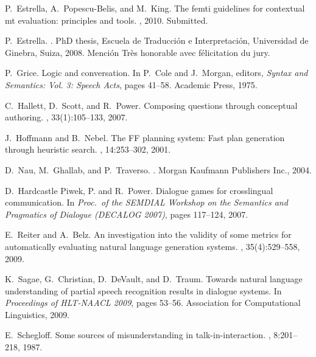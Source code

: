 \documentclass[11pt]{article}
\begin{document}
\begin{thebibliography}{}
P.~Estrella, A.~Popescu-Belis, and M.~King.
\newblock The femti guidelines for contextual mt evaluation: principles and
  tools.
, 2010.
\newblock Submitted.

P.~Estrella.
.
\newblock PhD thesis, Escuela de Traducción e Interpretación, Universidad de
  Ginebra, Suiza, 2008.
\newblock Menci\'on Tr\`es honorable avec f\'elicitation du jury.

P.~Grice.
\newblock Logic and conversation.
\newblock In P.~Cole and J.~Morgan, editors, {\em Syntax and Semantics: Vol. 3:
  Speech Acts}, pages 41--58. Academic Press, 1975.

C.~Hallett, D.~Scott, and R.~Power.
\newblock Composing questions through conceptual authoring.
, 33(1):105--133, 2007.

J.~Hoffmann and B.~Nebel.
\newblock The {FF} planning system: Fast plan generation through heuristic
  search.
, 14:253--302, 2001.

D.~Nau, M.~Ghallab, and P.~Traverso.
.
\newblock Morgan Kaufmann Publishers Inc., 2004.

D.~Hardcastle Piwek, P. and R.~Power.
\newblock Dialogue games for crosslingual communication.
\newblock In {\em Proc.\ of the {SEMDIAL} Workshop on the Semantics and
  Pragmatics of Dialogue ({DECALOG} 2007)}, pages 117--124, 2007.

E.~Reiter and A.~Belz.
\newblock An investigation into the validity of some metrics for automatically
  evaluating natural language generation systems.
, 35(4):529--558, 2009.

K.~Sagae, G.~Christian, D.~DeVault, and D.~Traum.
\newblock Towards natural language understanding of partial speech recognition
  results in dialogue systems.
\newblock In {\em Proceedings of HLT-NAACL 2009}, pages 53--56. Association for
  Computational Linguistics, 2009.

E.~Schegloff.
\newblock Some sources of misunderstanding in talk-in-interaction.
, 8:201--218, 1987.

\end{thebibliography}
\end{document}
